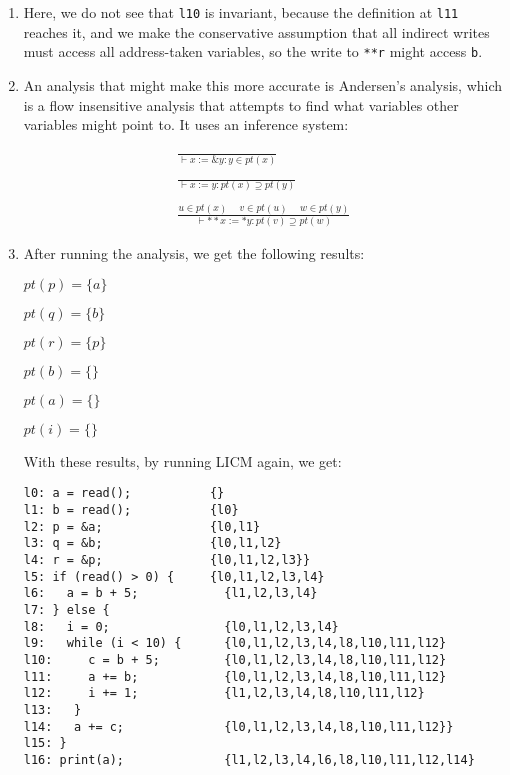 \begin{enumerate}[label=(\alph*)]
\begin{verbatim}
\end{verbatim}


\item
   Here, we do not see that \texttt{l10} is invariant, because the definition at \texttt{l11} reaches it, and we make the conservative assumption that all indirect writes must access all address-taken variables, so the write to \texttt{**r} might access \texttt{b}.

   \item
     An analysis that might make this more accurate is Andersen's analysis, which is a flow insensitive analysis that attempts to find what variables other variables might point to. It uses an inference system:

     \begin{align*}
       \frac{}{\vdash x := \&y : y \in pt(x)}\\\\
       \frac{}{\vdash x := y : pt(x) \supseteq pt(y)}\\\\
       \frac{u \in pt(x) \hspace{15pt}v \in pt(u) \hspace{15pt} w \in pt(y)}{\vdash **x := *y : pt(v) \supseteq pt(w)}
     \end{align*}

     \item
       After running the analysis, we get the following results:

       $pt(p) = \{a\}$
       
       $pt(q) = \{b\}$

       $pt(r) = \{p\}$

       $pt(b) = \{\}$

       $pt(a) = \{\}$

       $pt(i) = \{\}$

       With these results, by running LICM again, we get:

\begin{verbatim}
l0: a = read();           {}
l1: b = read();           {l0}
l2: p = &a;               {l0,l1}
l3: q = &b;               {l0,l1,l2}
l4: r = &p;               {l0,l1,l2,l3}}
l5: if (read() > 0) {     {l0,l1,l2,l3,l4}
l6:   a = b + 5;            {l1,l2,l3,l4}
l7: } else {
l8:   i = 0;                {l0,l1,l2,l3,l4}
l9:   while (i < 10) {      {l0,l1,l2,l3,l4,l8,l10,l11,l12}
l10:     c = b + 5;         {l0,l1,l2,l3,l4,l8,l10,l11,l12}
l11:     a += b;            {l0,l1,l2,l3,l4,l8,l10,l11,l12}
l12:     i += 1;            {l1,l2,l3,l4,l8,l10,l11,l12}
l13:   }
l14:   a += c;              {l0,l1,l2,l3,l4,l8,l10,l11,l12}}
l15: }
l16: print(a);              {l1,l2,l3,l4,l6,l8,l10,l11,l12,l14}
\end{verbatim}


\end{enumerate}
